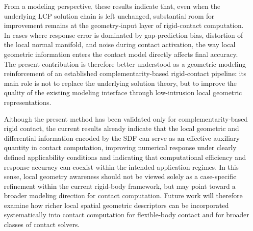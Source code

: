 From a modeling perspective, these results indicate that, even when the underlying LCP solution chain is left unchanged, substantial room for improvement remains at the geometry-input layer of rigid-contact computation. In cases where response error is dominated by gap-prediction bias, distortion of the local normal manifold, and noise during contact activation, the way local geometric information enters the contact model directly affects final accuracy. The present contribution is therefore better understood as a geometric-modeling reinforcement of an established complementarity-based rigid-contact pipeline: its main role is not to replace the underlying solution theory, but to improve the quality of the existing modeling interface through low-intrusion local geometric representations.

Although the present method has been validated only for complementarity-based rigid contact, the current results already indicate that the local geometric and differential information encoded by the SDF can serve as an effective auxiliary quantity in contact computation, improving numerical response under clearly defined applicability conditions and indicating that computational efficiency and response accuracy can coexist within the intended application regimes. In this sense, local geometry awareness should not be viewed solely as a case-specific refinement within the current rigid-body framework, but may point toward a broader modeling direction for contact computation. Future work will therefore examine how richer local spatial geometric descriptors can be incorporated systematically into contact computation for flexible-body contact and for broader classes of contact solvers.
